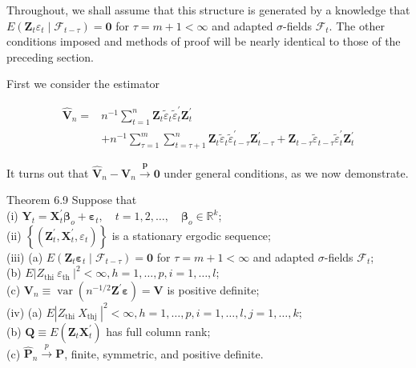 \documentclass[10pt]{article}
\begin{document}
Throughout, we shall assume that this structure is generated by a knowledge that $E\left(\mathbf{Z}_{t} \varepsilon_{t} \mid \mathcal{F}_{t-\tau}\right)=\mathbf{0}$ for $\tau=m+1<\infty$ and adapted $\sigma$-fields $\mathcal{F}_{t}$. The other conditions imposed and methods of proof will be nearly identical to those of the preceding section.

First we consider the estimator

$$
\begin{aligned}
\hat{\mathbf{V}}_{n}= & n^{-1} \sum_{t=1}^{n} \mathbf{Z}_{t} \tilde{\varepsilon}_{t} \tilde{\varepsilon}_{t}^{\prime} \mathbf{Z}_{t}^{\prime} \\
& +n^{-1} \sum_{\tau=1}^{m} \sum_{t=\tau+1}^{n} \mathbf{Z}_{t} \tilde{\varepsilon}_{t} \tilde{\varepsilon}_{t-\tau}^{\prime} \mathbf{Z}_{t-\tau}^{\prime}+\mathbf{Z}_{t-\tau} \tilde{\varepsilon}_{t-\tau} \tilde{\varepsilon}_{t}^{\prime} \mathbf{Z}_{t}^{\prime}
\end{aligned}
$$

It turns out that $\hat{\mathbf{V}}_{n}-\mathbf{V}_{n} \xrightarrow{\boldsymbol{p}} \mathbf{0}$ under general conditions, as we now demonstrate.

Theorem 6.9 Suppose that\\
(i) $\mathbf{Y}_{t}=\mathbf{X}_{t}^{\prime} \boldsymbol{\beta}_{o}+\boldsymbol{\varepsilon}_{t}, \quad t=1,2, \ldots, \quad \boldsymbol{\beta}_{o} \in \mathbb{R}^{k}$;\\
(ii) $\left\{\left(\mathbf{Z}_{t}^{\prime}, \mathbf{X}_{t}^{\prime}, \varepsilon_{t}\right)\right\}$ is a stationary ergodic sequence;\\
(iii) (a) $E\left(\mathbf{Z}_{t} \boldsymbol{\varepsilon}_{t} \mid \mathcal{F}_{t-\tau}\right)=\mathbf{0}$ for $\tau=m+1<\infty$ and adapted $\sigma$-fields $\mathcal{F}_{t}$;\\
(b) $E\left|Z_{\text {thi }} \varepsilon_{\text {th }}\right|^{2}<\infty, h=1, \ldots, p, i=1, \ldots, l$;\\
(c) $\mathbf{V}_{n} \equiv \operatorname{var}\left(n^{-1 / 2} \mathbf{Z}^{\prime} \boldsymbol{\varepsilon}\right)=\mathbf{V}$ is positive definite;\\
(iv) (a) $E\left|Z_{\text {thi }} X_{\text {thj }}\right|^{2}<\infty, h=1, \ldots, p, i=1, \ldots, l, j=1, \ldots, k$;\\
(b) $\mathbf{Q} \equiv E\left(\mathbf{Z}_{t} \mathbf{X}_{t}^{\prime}\right)$ has full column rank;\\
(c) $\hat{\mathbf{P}}_{n} \xrightarrow{p} \mathbf{P}$, finite, symmetric, and positive definite.
\end{document}

